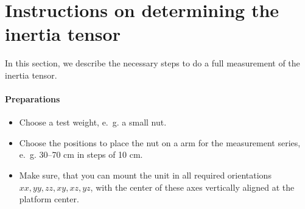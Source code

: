 \documentclass[journal]{IEEEtran}
\begin{document}



\clearpage
\appendices

\section{Instructions on determining the inertia tensor}
\label{sec:Instructions}

In this section, we describe the necessary steps to do a full measurement of the inertia tensor.

\paragraph{Preparations}
\begin{itemize}
	\item Choose a test weight, e.~g. a small nut.
	\item Choose the positions to place the nut on a arm for the measurement series, e.~g. 30--70 cm in steps of 10 cm.
	\item Make sure, that you can mount the unit in all required orientations $xx, yy, zz, xy, xz, yz$, with the center of these axes vertically aligned at the platform center. 
\end{itemize}
\end{document}
